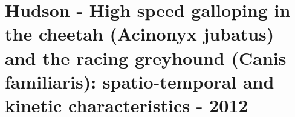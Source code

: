 \section{Hudson - High speed galloping in the cheetah (Acinonyx jubatus) and the racing greyhound (Canis familiaris): spatio-temporal and kinetic characteristics - 2012}